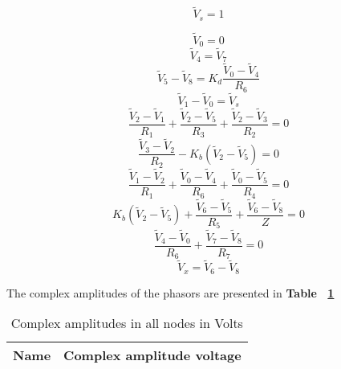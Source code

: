 \begin {equation}
	\tilde{V}_s = 1
	\label{eq:vs}
\end{equation}

\begin {equation}
	\tilde{V}_0 = 0
	\label{eq:p1}
\end{equation}
\begin {equation}
	\tilde{V}_4 = \tilde{V}_7
	\label{eq:p2}
\end{equation}
\begin {equation}
	\tilde{V}_5 - \tilde{V}_8 = K_d \frac{\tilde{V}_0 - \tilde{V}_4}{R_6}
	\label{eq:p3}
\end{equation}
\begin {equation}
	\tilde{V}_1 - \tilde{V}_0 = \tilde{V}_s
	\label{eq:p4}
\end{equation}
\begin {equation}
	\frac{\tilde{V}_2-\tilde{V}_1}{R_1} + \frac{\tilde{V}_2 - \tilde{V}_5}{R_3} + \frac{\tilde{V}_2 - \tilde{V}_3}{R_2} = 0
	\label{eq:p5}
\end{equation}
\begin {equation}
	\frac{\tilde{V}_3-\tilde{V}_2}{R_2} - K_b(\tilde{V}_2-\tilde{V}_5)  = 0
	\label{eq:p6}
\end{equation}
\begin {equation}
	\frac{\tilde{V}_1-\tilde{V}_2}{R_1} + \frac{\tilde{V}_0-\tilde{V}_4}{R_6} + \frac{\tilde{V}_0-\tilde{V}_5}{R_4} = 0
	\label{eq:p7}
\end{equation}
\begin {equation}
	K_b(\tilde{V}_2-\tilde{V}_5) + \frac{\tilde{V}_6-\tilde{V}_5}{R_5} + \frac{\tilde{V}_6-\tilde{V}_8}{Z}  = 0
	\label{eq:p8}
\end{equation}
\begin {equation}
	\frac{\tilde{V}_4-\tilde{V}_0}{R_6} + \frac{\tilde{V}_7 - \tilde{V}_8}{R_7} = 0
	\label{eq:p9}
\end{equation}
\begin {equation}
	\tilde{V}_x = \tilde{V}_6 - \tilde{V}_8
	\label{eq:p10}
\end{equation}


The complex amplitudes of the phasors are presented in  \textbf{Table ~\ref{tab:equivalent resistor}}
\begin{table}[H]
  \centering
  \begin{tabular}{|l|r|}
    \hline    
    {\bf Name} & {\bf Complex amplitude voltage}\\ \hline
    
  \end{tabular}
  \vspace{10px}
  \caption{Complex amplitudes in all nodes in Volts}
  \label{tab:equivalent resistor}
\end{table}
\vspace{10cm}

